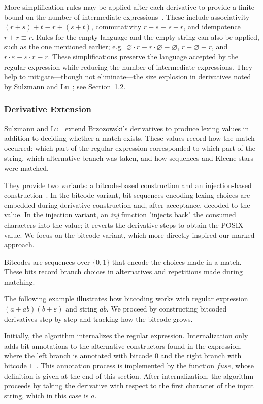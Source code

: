 \documentclass[12pt]{article}
\newcommand{\fuse}{\textit{fuse}}
\begin{document}
More simplification rules may be applied after each derivative to provide a finite bound on the number of intermediate 
expressions~\cite{TanAndUrban2023}. These include associativity $(r+s)+t \equiv r+(s+t)$, commutativity $r+s \equiv s+r$, 
and idempotence $r+r \equiv r$. Rules for the empty language and the empty string can also be applied, such as the one 
mentioned earlier; e.g.\ $\varnothing \cdot r \equiv r \cdot \varnothing \equiv \varnothing$, $r+\varnothing \equiv r$, 
and $r \cdot \varepsilon \equiv \varepsilon \cdot r \equiv r$. 
These simplifications preserve the language accepted by the regular expression while reducing the number of intermediate expressions. 
They help to mitigate—though not eliminate—the size explosion in derivatives noted by Sulzmann and Lu~\cite{Sulzmann2014}; see Section~1.2.
\subsubsection{Derivative Extension}

Sulzmann and Lu~\cite{Sulzmann2014} extend Brzozowski’s derivatives to produce lexing values in addition to deciding whether a match exists. 
These values record how the match occurred: which part of the regular expression corresponded to which part of the string, 
which alternative branch was taken, and how sequences and Kleene stars were matched.

They provide two variants: a bitcode-based construction and an injection-based construction~\cite{Sulzmann2014}.  
In the bitcode variant, bit sequences encoding lexing choices are embedded during derivative construction and, after acceptance, decoded to
the value. In the injection variant, an \textit{inj} function "injects back" the consumed characters into the value; it reverts 
the derivative steps to obtain the POSIX value. We focus on the bitcode variant, which more directly inspired our marked approach.

Bitcodes are sequences over $\{0,1\}$ that encode the choices made in a match.  
These bits record branch choices in alternatives and repetitions made during matching.

The following example illustrates how bitcoding works with regular expression $(a+ab)(b+\varepsilon)$ and string $ab$.  
We proceed by constructing bitcoded derivatives step by step and tracking how the bitcode grows.

Initially, the algorithm internalizes the regular expression.  
Internalization only adds bit annotations to the alternative constructors found in the expression, 
where the left branch is annotated with bitcode $0$ and the right branch with bitcode $1$~\cite{Sulzmann2014}.  
This annotation process is implemented by the function $\fuse$, whose definition is given at the end of this section.  
After internalization, the algorithm proceeds by taking the derivative with respect to the first character 
of the input string, which in this case is $a$.
\end{document}

